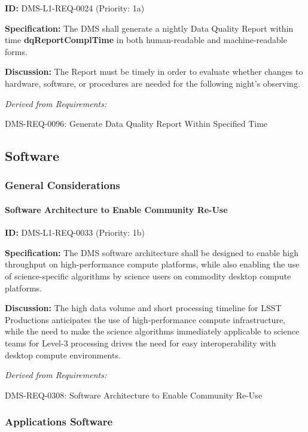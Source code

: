 \documentclass[SE,toc,lsstdraft]{lsstdoc}
\begin{document}
\label{DMS-L1-REQ-0024}
\textbf{ID:} DMS-L1-REQ-0024 (Priority: 1a)

\textbf{Specification:} The DMS shall generate a nightly Data Quality Report within time \textbf{dqReportComplTime }in both human-readable and machine-readable forms.

\textbf{Discussion:} The Report must be timely in order to evaluate whether changes to hardware, software, or procedures are needed for the following night's observing.

\emph{Derived from Requirements:}

DMS-REQ-0096:
Generate Data Quality Report Within Specified Time \newline

\subsection{Software}

\subsubsection{General Considerations}

\paragraph{Software Architecture to Enable Community Re-Use}\hfill  %

\label{DMS-L1-REQ-0033}
\textbf{ID:} DMS-L1-REQ-0033 (Priority: 1b)

\textbf{Specification:} The DMS software architecture shall be designed to enable high throughput on high-performance compute platforms, while also enabling the use of science-specific algorithms by science users on commodity desktop compute platforms.

\textbf{Discussion: }The high data volume and short processing timeline for LSST Productions anticipates the use of high-performance compute infrastructure, while the need to make the science algorithms immediately applicable to science teams for Level-3 processing drives the need for easy interoperability with desktop compute environments.

\emph{Derived from Requirements:}

DMS-REQ-0308:
Software Architecture to Enable Community Re-Use \newline

\subsubsection{Applications Software}
\end{document}
